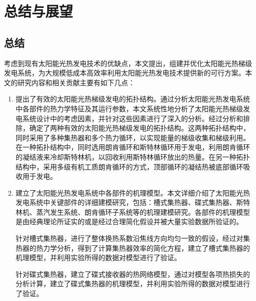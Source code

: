 \chapter{总结与展望}
\section{总结}

考虑到现有太阳能光热发电技术的优缺点，本文提出，组建并优化太阳能光热梯级发电系统，为大规模低成本高效率利用太阳能光热发电技术提供新的可行方案。本文的研究内容和相关贡献主要有如下几点：

\begin{enumerate}[label=(\arabic*)]
  \item 提出了有效的太阳能光热梯级发电的拓扑结构。通过分析太阳能光热发电系统中各部件的热力学特征及其运行参数，本文系统性地分析了太阳能光热梯级发电系统设计中的考虑因素，并针对这些因素进行了深入的分析。经过分析和排除，确定了两种有效的太阳能光热梯级发电的拓扑结构。这两种拓扑结构中，同时采用了多种集热器和多个热力循环，以实现能量的梯级收集和梯级利用。在一种拓扑结构中，同时选用朗肯循环和斯特林循环用于发电，利用朗肯循环的凝结液来冷却斯特林机，以回收利用斯特林循环放出的热量。在另一种拓扑结构中，采用多级有机工质朗肯循环的方式，顶部循环的凝结热被底部循环吸收用于发电。
  \item 建立了太阳能光热发电系统中各部件的机理模型。本文详细介绍了太阳能光热发电系统中关键部件的详细建模研究，包括：槽式集热器、碟式集热器、斯特林机、蒸汽发生系统、朗肯循环子系统等的机理建模研究。各部件的机理模型是由经典理论所证实的或是经过合理简化假设并被大量实验数据所验证的。
  
\setlength\parindent{2em}针对槽式集热器，进行了整体换热系数沿焦线方向均匀一致的假设，经过对集热器的热力学分析，得到了计算集热器效率的简化方程，建立了槽式集热器的机理模型，并利用实验所得的数据对模型进行了验证。
  
  针对碟式集热器，建立了碟式接收器的热网络模型，通过对模型各项热损失的分析计算，建立了碟式集热器的机理模型，并利用实验所得的数据对模型进行了验证。
  

\end{enumerate}
